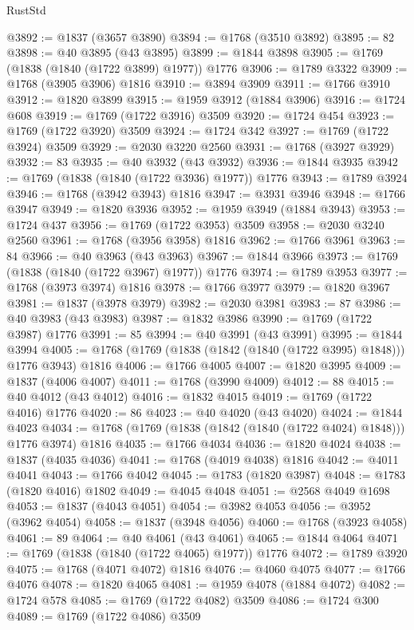 \begin{lexlean}{RustStd}
\begin{coremodule}
@3892 := @1837 (@3657 @3890)
@3894 := @1768 (@3510 @3892)
@3895 := 82
@3898 := @40 @3895 (@43 @3895)
@3899 := @1844 @3898
@3905 := @1769 (@1838 (@1840 (@1722 @3899) @1977)) @1776
@3906 := @1789 @3322
@3909 := @1768 (@3905 @3906) @1816
@3910 := @3894 @3909
@3911 := @1766 @3910
@3912 := @1820 @3899
@3915 := @1959 @3912 (@1884 @3906)
@3916 := @1724 @608
@3919 := @1769 (@1722 @3916) @3509
@3920 := @1724 @454
@3923 := @1769 (@1722 @3920) @3509
@3924 := @1724 @342
@3927 := @1769 (@1722 @3924) @3509
@3929 := @2030 @3220 @2560
@3931 := @1768 (@3927 @3929)
@3932 := 83
@3935 := @40 @3932 (@43 @3932)
@3936 := @1844 @3935
@3942 := @1769 (@1838 (@1840 (@1722 @3936) @1977)) @1776
@3943 := @1789 @3924
@3946 := @1768 (@3942 @3943) @1816
@3947 := @3931 @3946
@3948 := @1766 @3947
@3949 := @1820 @3936
@3952 := @1959 @3949 (@1884 @3943)
@3953 := @1724 @437
@3956 := @1769 (@1722 @3953) @3509
@3958 := @2030 @3240 @2560
@3961 := @1768 (@3956 @3958) @1816
@3962 := @1766 @3961
@3963 := 84
@3966 := @40 @3963 (@43 @3963)
@3967 := @1844 @3966
@3973 := @1769 (@1838 (@1840 (@1722 @3967) @1977)) @1776
@3974 := @1789 @3953
@3977 := @1768 (@3973 @3974) @1816
@3978 := @1766 @3977
@3979 := @1820 @3967
@3981 := @1837 (@3978 @3979)
@3982 := @2030 @3981
@3983 := 87
@3986 := @40 @3983 (@43 @3983)
@3987 := @1832 @3986
@3990 := @1769 (@1722 @3987) @1776
@3991 := 85
@3994 := @40 @3991 (@43 @3991)
@3995 := @1844 @3994
@4005 := @1768 (@1769 (@1838 (@1842 (@1840 (@1722 @3995) @1848))) @1776 @3943) @1816
@4006 := @1766 @4005
@4007 := @1820 @3995
@4009 := @1837 (@4006 @4007)
@4011 := @1768 (@3990 @4009)
@4012 := 88
@4015 := @40 @4012 (@43 @4012)
@4016 := @1832 @4015
@4019 := @1769 (@1722 @4016) @1776
@4020 := 86
@4023 := @40 @4020 (@43 @4020)
@4024 := @1844 @4023
@4034 := @1768 (@1769 (@1838 (@1842 (@1840 (@1722 @4024) @1848))) @1776 @3974) @1816
@4035 := @1766 @4034
@4036 := @1820 @4024
@4038 := @1837 (@4035 @4036)
@4041 := @1768 (@4019 @4038) @1816
@4042 := @4011 @4041
@4043 := @1766 @4042
@4045 := @1783 (@1820 @3987)
@4048 := @1783 (@1820 @4016) @1802
@4049 := @4045 @4048
@4051 := @2568 @4049 @1698
@4053 := @1837 (@4043 @4051)
@4054 := @3982 @4053
@4056 := @3952 (@3962 @4054)
@4058 := @1837 (@3948 @4056)
@4060 := @1768 (@3923 @4058)
@4061 := 89
@4064 := @40 @4061 (@43 @4061)
@4065 := @1844 @4064
@4071 := @1769 (@1838 (@1840 (@1722 @4065) @1977)) @1776
@4072 := @1789 @3920
@4075 := @1768 (@4071 @4072) @1816
@4076 := @4060 @4075
@4077 := @1766 @4076
@4078 := @1820 @4065
@4081 := @1959 @4078 (@1884 @4072)
@4082 := @1724 @578
@4085 := @1769 (@1722 @4082) @3509
@4086 := @1724 @300
@4089 := @1769 (@1722 @4086) @3509

\end{coremodule}
\end{lexlean}
